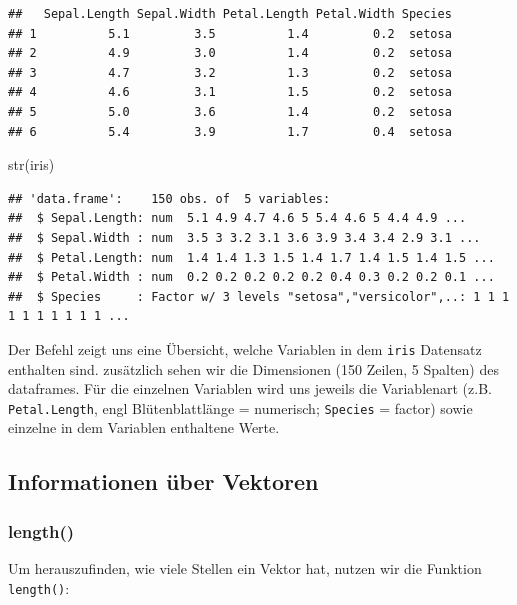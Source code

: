 \documentclass[
]{book}
\newenvironment{Shaded}{\begin{snugshade}}{\end{snugshade}}
\newcommand{\FunctionTok}[1]{\textcolor[rgb]{0.00,0.00,0.00}{#1}}
\newcommand{\NormalTok}[1]{#1}
\begin{document}
\begin{verbatim}
##   Sepal.Length Sepal.Width Petal.Length Petal.Width Species
## 1          5.1         3.5          1.4         0.2  setosa
## 2          4.9         3.0          1.4         0.2  setosa
## 3          4.7         3.2          1.3         0.2  setosa
## 4          4.6         3.1          1.5         0.2  setosa
## 5          5.0         3.6          1.4         0.2  setosa
## 6          5.4         3.9          1.7         0.4  setosa
\end{verbatim}

\begin{Shaded}
\begin{Highlighting}[]
\FunctionTok{str}\NormalTok{(iris)}
\end{Highlighting}
\end{Shaded}

\begin{verbatim}
## 'data.frame':    150 obs. of  5 variables:
##  $ Sepal.Length: num  5.1 4.9 4.7 4.6 5 5.4 4.6 5 4.4 4.9 ...
##  $ Sepal.Width : num  3.5 3 3.2 3.1 3.6 3.9 3.4 3.4 2.9 3.1 ...
##  $ Petal.Length: num  1.4 1.4 1.3 1.5 1.4 1.7 1.4 1.5 1.4 1.5 ...
##  $ Petal.Width : num  0.2 0.2 0.2 0.2 0.2 0.4 0.3 0.2 0.2 0.1 ...
##  $ Species     : Factor w/ 3 levels "setosa","versicolor",..: 1 1 1 1 1 1 1 1 1 1 ...
\end{verbatim}

Der Befehl zeigt uns eine Übersicht, welche Variablen in dem \texttt{iris} Datensatz enthalten sind. zusätzlich sehen wir die Dimensionen (150 Zeilen, 5 Spalten) des dataframes. Für die einzelnen Variablen wird uns jeweils die Variablenart (z.B. \texttt{Petal.Length}, engl Blütenblattlänge = numerisch; \texttt{Species} = factor) sowie einzelne in dem Variablen enthaltene Werte.

\hypertarget{informationen-uxfcber-vektoren}{%
\subsection{Informationen über Vektoren}\label{informationen-uxfcber-vektoren}}

\hypertarget{length}{%
\subsubsection{length()}\label{length}}

Um herauszufinden, wie viele Stellen ein Vektor hat, nutzen wir die Funktion \texttt{length()}:
\end{document}
